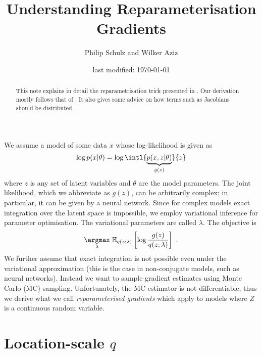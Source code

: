 \documentclass[a4paper,11pt]{article}
\author{Philip Schulz and Wilker Aziz}
\title{Understanding Reparameterisation Gradients}
\date{last modified: \today}
\begin{document}
\maketitle

\begin{abstract}
This note explains in detail the reparametrisation trick presented in \citep{KingmaWelling:2013,RezendeEtAl:2014,TitsiasLazarogredilla:2014}. 
Our derivation mostly follows that of \citet{TitsiasLazarogredilla:2014}. It also gives some advice on how terms such as Jacobians should be distributed.
\end{abstract}


We assume a model of some data $ x $ whose log-likelihood is given as
\begin{equation}
\log p(x|\theta) = \log \intl { \underbrace{p(x,z|\theta)}_{g(z)} } {z} 
\end{equation}
where $ z $ is any set of latent variables and $ \theta $ are the model parameters. The joint likelihood, which we abbreviate as $ g(z) $, can be arbitrarily
complex; in particular, it can be given by a neural network. Since for complex models exact integration over the latent space is impossible, we employ variational
inference for parameter optimisation. The variational parameters are called $ \lambda $. The objective is
\begin{equation} \label{eq:objective}
\underset{\lambda}{\argmax} ~ \mathbb E_{q(z; \lambda)}\left[ \log \frac{g(z)}{q(z; \lambda)} \right] \ .
\end{equation}
We further assume that exact integration is not possible even under the variational approximation (this is the case in non-conjugate models, such as neural networks). Instead we want to sample gradient estimates using Monte Carlo (MC) sampling. Unfortunately, the MC estimator is not differentiable, thus we derive what we call \emph{reparameterised gradients} which apply to models where $Z$ is a continuous random variable.

\section{Location-scale $q$}
 
\end{document}
